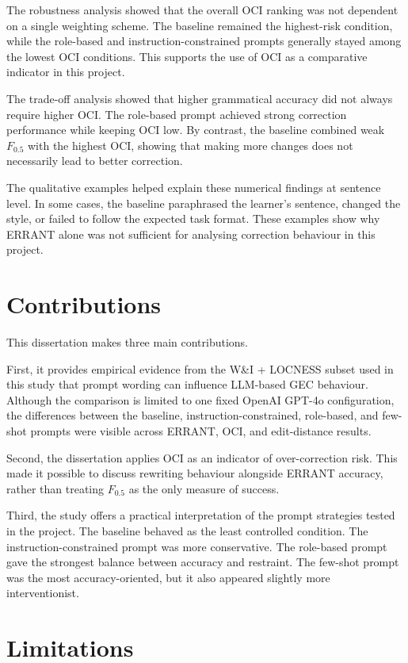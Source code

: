 The robustness analysis showed that the overall OCI ranking was not dependent on a single weighting scheme. The baseline remained the highest-risk condition, while the role-based and instruction-constrained prompts generally stayed among the lowest OCI conditions. This supports the use of OCI as a comparative indicator in this project.

The trade-off analysis showed that higher grammatical accuracy did not always require higher OCI. The role-based prompt achieved strong correction performance while keeping OCI low. By contrast, the baseline combined weak $F_{0.5}$ with the highest OCI, showing that making more changes does not necessarily lead to better correction.

The qualitative examples helped explain these numerical findings at sentence level. In some cases, the baseline paraphrased the learner's sentence, changed the style, or failed to follow the expected task format. These examples show why ERRANT alone was not sufficient for analysing correction behaviour in this project.

\section{Contributions}

This dissertation makes three main contributions.

First, it provides empirical evidence from the W\&I + LOCNESS subset used in this study that prompt wording can influence LLM-based GEC behaviour. Although the comparison is limited to one fixed OpenAI GPT-4o configuration, the differences between the baseline, instruction-constrained, role-based, and few-shot prompts were visible across ERRANT, OCI, and edit-distance results.

Second, the dissertation applies OCI as an indicator of over-correction risk. This made it possible to discuss rewriting behaviour alongside ERRANT accuracy, rather than treating $F_{0.5}$ as the only measure of success.

Third, the study offers a practical interpretation of the prompt strategies tested in the project. The baseline behaved as the least controlled condition. The instruction-constrained prompt was more conservative. The role-based prompt gave the strongest balance between accuracy and restraint. The few-shot prompt was the most accuracy-oriented, but it also appeared slightly more interventionist.

\section{Limitations}

